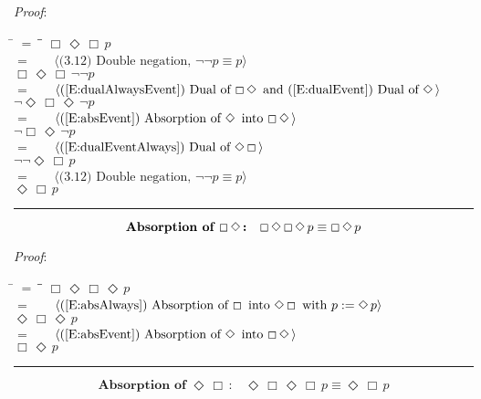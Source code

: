 \documentclass[12pt, fleqn, leqno]{article}
\newcommand{\lgap}{2pt}                             %
\newcommand{\mymathindent}{24pt}                    %
\newcommand{\Event}{\Diamond\,}
\newcommand{\Always}{\Box\,}
\newcommand{\myqed}{\rule[-.23ex]{1.2ex}{2.0ex}}
\newcommand{\myqedtab}{\hspace{384pt}}              %
\newcommand{\Gll} {\langle}                         %
\newcommand{\Ggg} {\rangle}                         %
\newcommand{\Hint}[1]     {\ \ \ $\Gll              \mbox{#1} \Ggg$ }   %
\begin{document}
\emph{Proof}:
\begin{tabbing}
\hspace{\mymathindent} \= $= \;$ \= \myqedtab \= \kill
  \> \>   $\Always\Event\Always p$\\[\lgap]
  \> $=$  \>  \Hint{(3.12) Double negation, $\neg\neg p\equiv p$}\\[\lgap]
  \> \>   $\Always\Event\Always \neg\neg p$\\[\lgap]
  \> $=$  \>  \Hint{(\ref{E:dualAlwaysEvent}) Dual of $\Always\Event$ and (\ref{E:dualEvent}) Dual of $\Event$}\\[\lgap]
  \> \>   $\neg\Event\Always\Event \neg p$\\[\lgap]
  \> $=$  \>  \Hint{(\ref{E:absEvent}) Absorption of $\Event$ into $\Always\Event$}\\[\lgap]
  \> \>   $\neg\Always\Event \neg p$\\[\lgap]
  \> $=$  \>  \Hint{(\ref{E:dualEventAlways}) Dual of $\Event \Always$}\\[\lgap]
  \> \>   $\neg\neg\Event\Always p$\\[\lgap]
  \> $=$  \>  \Hint{(3.12) Double negation, $\neg\neg p\equiv p$}\\[\lgap]
  \> \>   $\Event\Always p$ \quad \myqed
\end{tabbing}
\begin{equation}\label{E:absAlwaysEvent}
\textbf{Absorption of $ \Always\Event$:}\quad \Always \Event\Always\Event p \equiv \Always\Event p
\end{equation}

\emph{Proof}:
\begin{tabbing}
\hspace{\mymathindent} \= $= \;$ \= \myqedtab \= \kill
  \> \>   $\Always \Event\Always\Event p$\\[\lgap]
  \> $=$  \>  \Hint{(\ref{E:absAlways}) Absorption of $\Always$ into $\Event\Always$ with $p:=\Event p$}\\[\lgap]
  \> \>   $\Event \Always \Event p$\\[\lgap]
  \> $=$ \> \Hint{(\ref{E:absEvent}) Absorption of $\Event$ into $\Always\Event$}\\[\lgap]
  \> \>   $\Always\Event p$ \quad \myqed
\end{tabbing}
\begin{equation}\label{E:absEventAlways}
\textbf{Absorption of $\Event \Always$:}\quad \Event \Always \Event\Always p \equiv \Event\Always p
\end{equation}
\end{document}
